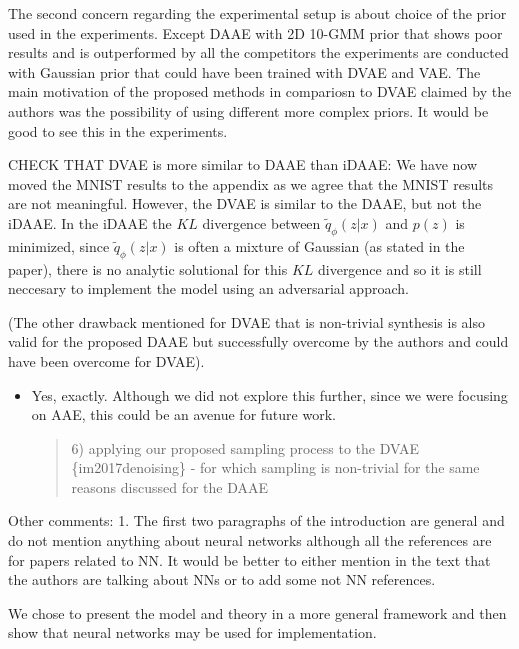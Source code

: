 \documentclass{article}
\begin{document}
{\color{blue}
The second concern regarding the experimental setup is about choice of the prior used in the experiments. Except DAAE with 2D 10-GMM prior that shows poor results and is outperformed by all the competitors the experiments are conducted with Gaussian prior that could have been trained with DVAE and VAE. The main motivation of the proposed methods in compariosn to DVAE claimed by the authors was the possibility of using different more complex priors. It would be good to see this in the experiments.}\newline 

{\color{red} CHECK THAT DVAE is more similar to DAAE than iDAAE: We have now moved the MNIST results to the appendix as we agree that the MNIST results are not meaningful. However, the DVAE is similar to the DAAE, but not the iDAAE. In the iDAAE the $KL$ divergence between $\tilde{q}_\phi(z|x)$ and $p(z)$ is minimized, since $\tilde{q}_\phi(z|x)$ is often a mixture of Gaussian (as stated in the paper), there is no analytic solutional for this $KL$ divergence and so it is still neccesary to implement the model using an adversarial approach.}


{\color{blue}(The other drawback mentioned for DVAE that is non-trivial synthesis is also valid for the proposed DAAE but successfully overcome by the authors and could have been overcome for DVAE)}. \newline

\begin{itemize}
    \item Yes, exactly. Although we did not explore this further, since we were focusing on AAE, this could be an avenue for future work.
    \begin{quote}
        6) applying our proposed sampling process to the DVAE \{im2017denoising\} - for which sampling is non-trivial for the same reasons discussed for the DAAE
    \end{quote}
\end{itemize}


Other comments: \newline
{\color{blue}
1. The first two paragraphs of the introduction are general and do not mention anything about neural networks although all the references are for papers related to NN. It would be better to either mention in the text that the authors are talking about NNs or to add some not NN references.}

We chose to present the model and theory in a more general framework and then show that neural networks may be used for implementation.
    
\end{document}
